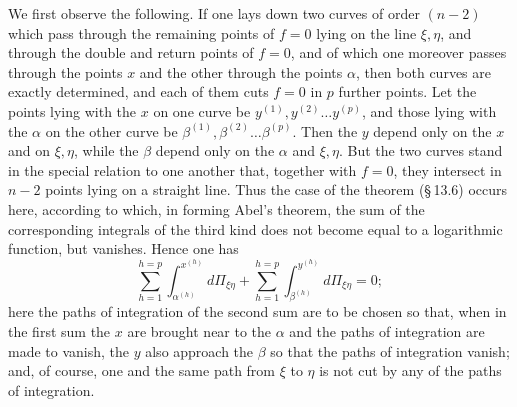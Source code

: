\documentclass[10pt]{article}
\begin{document}
We first observe the following. If one lays down two curves of order \((n-2)\) which pass through the remaining points of \(f=0\) lying on the line \(\xi,\eta\), and through the double and return points of \(f=0\), and of which one moreover passes through the points \(x\) and the other through the points \(\alpha\), then both curves are exactly determined, and each of them cuts \(f=0\) in \(p\) further points. Let the points lying with the \(x\) on one curve be \(y^{(1)},y^{(2)}\ldots y^{(p)}\), and those lying with the \(\alpha\) on the other curve be \(\beta^{(1)},\beta^{(2)}\ldots\beta^{(p)}\). Then the \(y\) depend only on the \(x\) and on \(\xi,\eta\), while the \(\beta\) depend only on the \(\alpha\) and \(\xi,\eta\). But the two curves stand in the special relation to one another that, together with \(f=0\), they intersect in \(n-2\) points lying on a straight line. Thus the case of the theorem (\S\,13.6) occurs here, according to which, in forming Abel's theorem, the sum of the corresponding integrals of the third kind does not become equal to a logarithmic function, but vanishes. Hence one has
\[
\sum_{h=1}^{h=p}\int_{\alpha^{(h)}}^{x^{(h)}}d\Pi_{\xi\eta}
+\sum_{h=1}^{h=p}\int_{\beta^{(h)}}^{y^{(h)}}d\Pi_{\xi\eta}=0;
\]
here the paths of integration of the second sum are to be chosen so that, when in the first sum the \(x\) are brought near to the \(\alpha\) and the paths of integration are made to vanish, the \(y\) also approach the \(\beta\) so that the paths of integration vanish; and, of course, one and the same path from \(\xi\) to \(\eta\) is not cut by any of the paths of integration.
\end{document}
